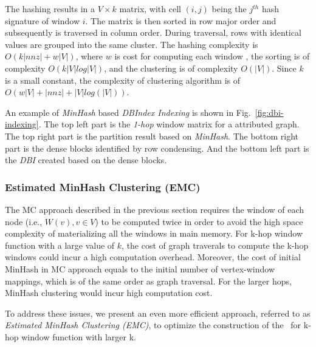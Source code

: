 {The hashing results in a $V \times k$ matrix, with cell $(i,j)$ being the $j^{th}$ hash signature of window $i$. The matrix is then sorted in row major order and subsequently is traversed in column order. During traversal, rows with identical values are grouped into the same cluster. The hashing complexity is $O(k|nnz|+w|V|)$, where $w$ is cost for computing each window , the sorting is of complexity $O(k|V|log|V|)$, and the clustering is of complexity $O(|V|)$. Since $k$ is a small constant, the complexity of clustering algorithm is of $O(w|V|+|nnz|+|V|log(|V|))$. 

An example of \emph{MinHash} based \emph{DBIndex Indexing} is shown in Fig.~\ref{fig:dbi-indexing}. The top left part is the \emph{1-hop} window matrix for a attributed graph. The top right part is the partition result based on \emph{MinHash}. The bottom right part is the dense blocks identified by row condensing. And the bottom left part is the \emph{DBI} created based on the dense blocks.
}




\subsubsection{Estimated MinHash Clustering (EMC)}
\label{sec:optimized}

The MC approach described in the previous section requires the window of each node (i.e., $W(v), v \in V$)
to be computed twice in order to avoid the high space complexity of materializing all the windows in main memory.
For k-hop window function with a large value of $k$, the cost of graph traverals to compute the k-hop windows
could incur a high computation overhead. Moreover, the cost of initial MinHash in MC approach equals to the initial number of vertex-window mappings, which is of the same order as graph traversal. For the larger hops, MinHash clustering would incur high computation cost.

To address these issues, we present an even more efficient approach,
referred to as {\it Estimated MinHash Clustering (EMC)}, 
to optimize the construction of the \DBIndex\ for k-hop window function with larger k.

